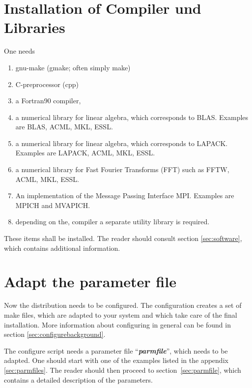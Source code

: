 \documentclass[a4paper,10pt]{report}
\newcommand{\myspec}[1]{\textbf{\textit{#1}}}
\begin{document}
\section{Installation of Compiler und Libraries}
One needs
\begin{enumerate}
\item gnu-make (gmake; often simply make)
\item C-preprocessor (cpp)
\item a Fortran90 compiler, 
\item a numerical library for linear algebra, which corresponds to
BLAS. Examples are BLAS, ACML, MKL, ESSL.
\item a numerical library for linear algebra, which corresponds to
LAPACK. Examples are LAPACK, ACML, MKL, ESSL.
\item a numerical library for Fast Fourier Transforms (FFT) such as
FFTW, ACML, MKL, ESSL.
\item An implementation of the Message Passing Interface
MPI. Examples are MPICH
and MVAPICH.
\item depending on the, compiler a separate utility library is required.
\end{enumerate}
These items shall be installed. The reader should consult section
\ref{sec:software}, which contains additional information.

\section{Adapt the parameter file}
Now the distribution needs to be configured. The configuration
creates a set of make files, which are adapted to your system and
which take care of the final installation. More information about
configuring in general can be found in section
\ref{sec:configurebackground}.

The configure script needs a parameter file
``\myspec{parmfile}'', which
needs to be adapted. One should start with one of the examples listed
in the appendix \ref{sec:parmfiles}. The reader should then proceed to
section~\ref{sec:parmfile}, which contains a detailed description of
the parameters.
\end{document}

